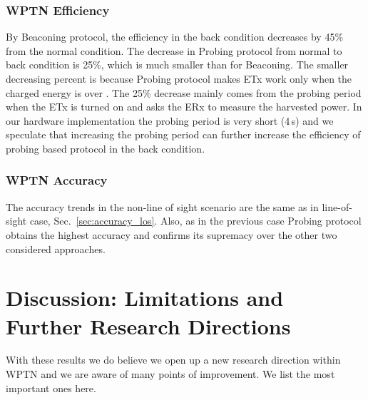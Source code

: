 \documentclass[11pt,draftclsnofoot,journal,onecolumn]{IEEEtran}
\newcommand{\txRssiThreshold}{}
\begin{document}
\subsubsection{WPTN Efficiency}
\label{sec:efficiency_nlos}

By Beaconing protocol, the efficiency in the back condition decreases by 45\% from the normal condition.
The decrease in Probing protocol from normal to back condition is 25\%, which is much smaller than for Beaconing. The smaller decreasing percent is because Probing protocol makes ETx work only when the charged energy is over \txRssiThreshold. The 25\% decrease mainly comes from the probing period when the ETx is turned on and asks the ERx to measure the harvested power. In our hardware implementation the probing period is very short (4\,s) and we speculate that increasing the probing period can further increase the efficiency of probing based protocol in the back condition.

\subsubsection{WPTN Accuracy}
\label{sec:accuracy_nlos}

The accuracy trends in the non-line of sight scenario are the same as in line-of-sight case, Sec.~\ref{sec:accuracy_los}. Also, as in the previous case Probing protocol obtains the highest accuracy and confirms its supremacy over the other two considered approaches.

\section{Discussion: Limitations and Further Research Directions}
\label{sec:discussion}

With these results we do believe we open up a new research direction within WPTN and we are aware of many points of improvement. We list the most important ones here.
\end{document}
